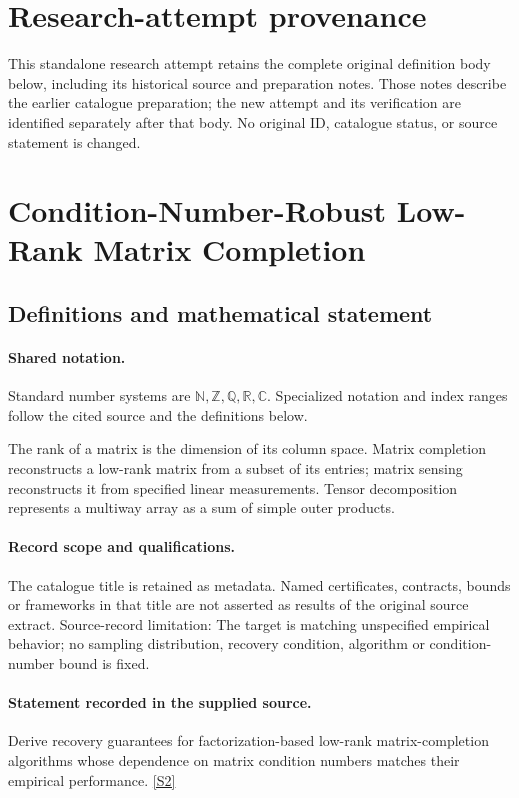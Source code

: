 \documentclass[11pt]{article}
\begin{document}
\section*{Research-attempt provenance}
This standalone research attempt retains the complete original definition body below,
including its historical source and preparation notes. Those notes describe the
earlier catalogue preparation; the new attempt and its verification are identified
separately after that body. No original ID, catalogue status, or source statement is changed.

\section{Condition-Number-Robust Low-Rank Matrix Completion}\label{statement}

\subsection{Definitions and mathematical statement}

\paragraph{Shared notation.}Standard number systems are $\mathbb N,\mathbb Z,\mathbb Q,\mathbb R,\mathbb C$. Specialized notation and index ranges follow the cited source and the definitions below.


The rank of a matrix is the dimension of its column space. Matrix completion reconstructs a low-rank matrix from a subset of its entries; matrix sensing reconstructs it from specified linear measurements. Tensor decomposition represents a multiway array as a sum of simple outer products.
\paragraph{Record scope and qualifications.}
The catalogue title is retained as metadata. Named certificates, contracts, bounds or frameworks in that title are not asserted as results of the original source extract.
Source-record limitation: The target is matching unspecified empirical behavior; no sampling distribution, recovery condition, algorithm or condition-number bound is fixed.
\paragraph{Statement recorded in the supplied source.}
Derive recovery guarantees for factorization-based low-rank matrix-completion algorithms whose dependence on matrix condition numbers matches their empirical performance. \href{https://doi.org/10.4171/owr/2022/25}{[S2]}
\end{document}
